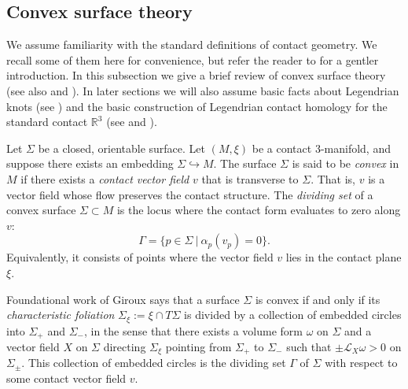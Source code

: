 \documentclass[11pt]{amsart}
\theoremstyle{mystyle}
\newtheorem{example}[example]{Example}
\newcommand{\R}{\mathbb{R}}
\newcommand{\de}{\text{d}}
\newcommand{\<}{\langle}
\renewcommand{\>}{\rangle}
\begin{document}

\subsection{Convex surface theory}

We assume familiarity with the standard definitions of contact geometry. We recall some of them here for convenience, but refer the reader to \cite{etnyre2003convex} for a gentler introduction. In this subsection we give a brief review of convex surface theory (see also \cite[Sec. 4.6, 4.8]{geiges2006contact} and \cite{etnyre2025convex}). In later sections we will also assume basic facts about Legendrian knots (see \cite[Sec. 3.1, 3.2, 3.5]{geiges2006contact}) and the basic construction of Legendrian contact homology for the standard contact $\R^3$ (see \cite{Ghiggini2012} and \cite{EtnyreNg2022}).

Let $\Sigma$ be a closed, orientable surface. Let $(M,\xi)$ be a contact $3$-manifold, and suppose there exists an embedding $\Sigma\hookrightarrow M$. The surface $\Sigma$ is said to be \textit{convex} in $M$ if there exists a \textit{contact vector field} $v$ that is transverse to $\Sigma$. That is, $v$ is a vector field whose flow preserves the contact structure.  The \textit{dividing set}  of a convex surface $\Sigma \subset M$ is the locus where the contact form evaluates to zero along $v$:
    \[
    \Gamma = \{ p \in \Sigma \ | \ \alpha_p(v_p) = 0 \}.
    \]
    Equivalently, it consists of points where the vector field $v$ lies in the contact plane $\xi$. 

    Foundational work of Giroux \cite{giroux1991convex} says that a surface $\Sigma$ is convex if and only if its \textit{characteristic foliation} $\Sigma_\xi := \xi\cap T\Sigma$ is divided by a collection of embedded circles into $\Sigma_+$ and $\Sigma_-$, in the sense that there exists a volume form $\omega$ on $\Sigma$ and a vector field $X$ on $\Sigma$ directing $\Sigma_\xi$ pointing from $\Sigma_+$ to $\Sigma_-$ such that $\pm \mathcal{L}_X \omega > 0$ on $\Sigma_\pm$. This collection of embedded circles is the dividing set $\Gamma$ of $\Sigma$ with respect to some contact vector field $v$. 
    
\end{document}
